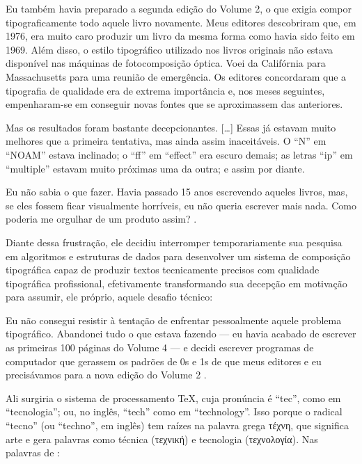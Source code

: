 \begin{citacao}
    Eu também havia preparado a segunda edição do Volume 2, o que exigia compor tipograficamente todo aquele livro novamente. Meus editores descobriram que, em 1976, era muito caro produzir um livro da mesma forma como havia sido feito em 1969. Além disso, o estilo tipográfico utilizado nos livros originais não estava disponível nas máquinas de fotocomposição óptica. Voei da Califórnia para Massachusetts para uma reunião de emergência. Os editores concordaram que a tipografia de qualidade era de extrema importância e, nos meses seguintes, empenharam-se em conseguir novas fontes que se aproximassem das anteriores.

    Mas os resultados foram bastante decepcionantes. [\ldots] Essas já estavam muito melhores que a primeira tentativa, mas ainda assim inaceitáveis. O ``N'' em ``NOAM'' estava inclinado; o ``ff'' em ``effect'' era escuro demais; as letras ``ip'' em ``multiple'' estavam muito próximas uma da outra; e assim por diante.

    Eu não sabia o que fazer. Havia passado 15 anos escrevendo aqueles livros, mas, se eles fossem ficar visualmente horríveis, eu não queria escrever mais nada. Como poderia me orgulhar de um produto assim?
    \cite[tradução própria]{Knuth1996Kyoto}.
\end{citacao}

Diante dessa frustração, ele decidiu interromper temporariamente sua pesquisa em algoritmos e estruturas de dados para desenvolver um sistema de composição tipográfica capaz de produzir textos tecnicamente precisos com qualidade tipográfica profissional, efetivamente transformando sua decepção em motivação para assumir, ele próprio, aquele desafio técnico:

\begin{citacao}
    Eu não consegui resistir à tentação de enfrentar pessoalmente aquele problema tipográfico. Abandonei tudo o que estava fazendo --- eu havia acabado de escrever as primeiras 100 páginas do Volume 4 --- e decidi escrever programas de computador que gerassem os padrões de 0s e 1s de que meus editores e eu precisávamos para a nova edição do Volume 2
    \cite[tradução própria]{Knuth1996Kyoto}.
\end{citacao}

Ali surgiria o sistema de processamento \TeX, cuja pronúncia é ``tec'', como em ``tecnologia''; ou, no inglês, ``tech'' como em ``technology''. Isso porque o radical ``tecno'' (ou ``techno'', em inglês) tem raízes na palavra grega \foreignlanguage{greek}{τέχνη}, que significa arte e gera palavras como técnica (\foreignlanguage{greek}{τεχνική}) e tecnologia (\foreignlanguage{greek}{τεχνολογία}). Nas palavras de \textcite{Knuth1984}:

